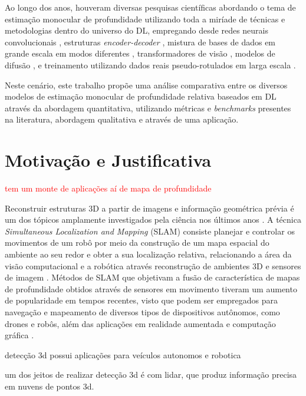 Ao longo dos anos, houveram diversas pesquisas científicas abordando o tema de estimação monocular de profundidade utilizando toda a miríade de técnicas e metodologias dentro do universo do DL, empregando desde redes neurais convolucionais \cite{kopf2021robust}, estruturas \textit{encoder-decoder} \cite{godard2019digging}, mistura de bases de dados em grande escala em modos diferentes \cite{lasinger2019towards}, transformadores de visão \cite{birkl2023midas}, modelos de difusão \cite{ke2024repurposing}, e treinamento utilizando dados reais pseudo-rotulados em larga escala \cite{yang2024depth}. 

Neste cenário, este trabalho propõe uma análise comparativa entre os diversos modelos de estimação monocular de profundidade relativa baseados em DL através da abordagem quantitativa, utilizando métricas e \textit{benchmarks} presentes na literatura, abordagem qualitativa e através de uma aplicação.



\section{Motivação e Justificativa} 

\textcolor{red}{tem um monte de aplicações aí de mapa de profundidade}

Reconstruir estruturas 3D a partir de imagens e informação geométrica prévia é um dos tópicos amplamente investigados pela ciência nos últimos anos \cite{zhao2020monocular}. A técnica \textit{Simultaneous Localization and Mapping} (SLAM) consiste planejar e controlar os movimentos de um robô por meio da construção de um mapa espacial do ambiente ao seu redor e obter a sua localização relativa, relacionando a área da visão computacional e a robótica através reconstrução de ambientes 3D e sensores de imagem \cite{placed2023survey} \cite{stachniss2016simultaneous}. Métodos de SLAM que objetivam a fusão de característica de mapas de profundidade obtidos através de sensores em movimento tiveram um aumento de popularidade em tempos recentes, visto que podem ser empregados para navegação e mapeamento de diversos tipos de dispositivos autônomos, como drones e robôs, além das aplicações em realidade aumentada e computação gráfica \cite{tateno2017cnn}.


detecção 3d possui aplicações para veículos autonomos e robotica

um dos jeitos de realizar detecção 3d é com lidar, que produz informação precisa em nuvens de pontos 3d. 

